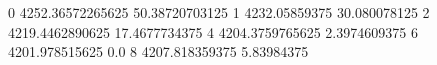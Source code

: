 0 4252.36572265625 50.38720703125
1 4232.05859375 30.080078125
2 4219.4462890625 17.4677734375
4 4204.3759765625 2.3974609375
6 4201.978515625 0.0
8 4207.818359375 5.83984375
